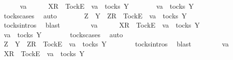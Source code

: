 \begin{isabellebody}
\ \ \ \ \isamarkupfalse%
\ va\isanewline
\ \ \ \ \isamarkupfalse%
\ {\isachardoublequoteopen}{\isacharbrackleft}X{\isacharbrackright}\isactrlsub R\ {\isacharhash}\ {\isacharbrackleft}Tock{\isacharbrackright}\isactrlsub E\ {\isacharhash}\ va\ {\isasymin}\ tocks\ Y{\isachardoublequoteclose}\isanewline
\ \ \ \ \isamarkupfalse%
\ \isamarkupfalse%
\ {\isachardoublequoteopen}va\ {\isasymin}\ tocks\ Y{\isachardoublequoteclose}\isanewline
\ \ \ \ \ \ \isamarkupfalse%
\ tocks{\isachardot}cases\ \isamarkupfalse%
\ auto\isanewline
\ \ \ \ \isamarkupfalse%
\ \isamarkupfalse%
\ {\isachardoublequoteopen}Z\ {\isasymsubseteq}\ Y\ {\isasymLongrightarrow}\ {\isacharbrackleft}Z{\isacharbrackright}\isactrlsub R\ {\isacharhash}\ {\isacharbrackleft}Tock{\isacharbrackright}\isactrlsub E\ {\isacharhash}\ va\ {\isasymin}\ tocks\ Y{\isachardoublequoteclose}\isanewline
\ \ \ \ \ \ \isamarkupfalse%
\ tocks{\isachardot}intros\ \isamarkupfalse%
\ blast\isanewline
\ \ \isamarkupfalse%
\isanewline
\ \ \ \ \isamarkupfalse%
\ va\isanewline
\ \ \ \ \isamarkupfalse%
\ {\isachardoublequoteopen}{\isacharbrackleft}X{\isacharbrackright}\isactrlsub R\ {\isacharhash}\ {\isacharbrackleft}Tock{\isacharbrackright}\isactrlsub E\ {\isacharhash}\ va\ {\isasymin}\ tocks\ Y{\isachardoublequoteclose}\isanewline
\ \ \ \ \isamarkupfalse%
\ \isamarkupfalse%
\ {\isachardoublequoteopen}va\ {\isasymin}\ tocks\ Y{\isachardoublequoteclose}\isanewline
\ \ \ \ \ \ \isamarkupfalse%
\ tocks{\isachardot}cases\ \isamarkupfalse%
\ auto\isanewline
\ \ \ \ \isamarkupfalse%
\ \isamarkupfalse%
\ {\isachardoublequoteopen}Z\ {\isasymsubseteq}\ Y\ {\isasymLongrightarrow}\ {\isacharbrackleft}Z{\isacharbrackright}\isactrlsub R\ {\isacharhash}\ {\isacharbrackleft}Tock{\isacharbrackright}\isactrlsub E\ {\isacharhash}\ va\ {\isasymin}\ tocks\ Y{\isachardoublequoteclose}\isanewline
\ \ \ \ \ \ \isamarkupfalse%
\ tocks{\isachardot}intros\ \isamarkupfalse%
\ blast\isanewline
\ \ \isamarkupfalse%
\isanewline
\ \ \ \ \isamarkupfalse%
\ va\isanewline
\ \ \ \ \isamarkupfalse%
\ {\isachardoublequoteopen}{\isacharbrackleft}X{\isacharbrackright}\isactrlsub R\ {\isacharhash}\ {\isacharbrackleft}Tock{\isacharbrackright}\isactrlsub E\ {\isacharhash}\ va\ {\isasymin}\ tocks\ Y{\isachardoublequoteclose}\isanewline

\end{isabellebody}
